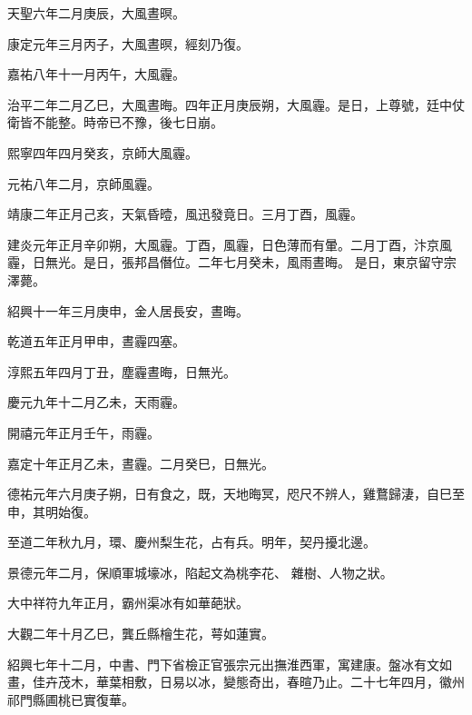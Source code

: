 \begin{pinyinscope}
 天聖六年二月庚辰，大風晝暝。



 康定元年三月丙子，大風晝暝，經刻乃復。



 嘉祐八年十一月丙午，大風霾。



 治平二年二月乙巳，大風晝晦。四年正月庚辰朔，大風霾。是日，上尊號，廷中仗衛皆不能整。時帝已不豫，後七日崩。



 熙寧四年四月癸亥，京師大風霾。



 元祐八年二月，京師風霾。



 靖康二年正月己亥，天氣昏曀，風迅發竟日。三月丁酉，風霾。



 建炎元年正月辛卯朔，大風霾。丁酉，風霾，日色薄而有暈。二月丁酉，汴京風霾，日無光。是日，張邦昌僭位。二年七月癸未，風雨晝晦。
 是日，東京留守宗澤薨。



 紹興十一年三月庚申，金人居長安，晝晦。



 乾道五年正月甲申，晝霾四塞。



 淳熙五年四月丁丑，塵霾晝晦，日無光。



 慶元九年十二月乙未，天雨霾。



 開禧元年正月壬午，雨霾。



 嘉定十年正月乙未，晝霾。二月癸巳，日無光。



 德祐元年六月庚子朔，日有食之，既，天地晦冥，咫尺不辨人，雞鶩歸淒，自巳至申，其明始復。



 至道二年秋九月，環、慶州梨生花，占有兵。明年，契丹擾北邊。



 景德元年二月，保順軍城壕冰，陷起文為桃李花、
 雜樹、人物之狀。



 大中祥符九年正月，霸州渠冰有如華葩狀。



 大觀二年十月乙巳，龔丘縣檜生花，萼如蓮實。



 紹興七年十二月，中書、門下省檢正官張宗元出撫淮西軍，寓建康。盤冰有文如畫，佳卉茂木，華葉相敷，日易以冰，變態奇出，春暄乃止。二十七年四月，徽州祁門縣圃桃已實復華。




\end{pinyinscope}

